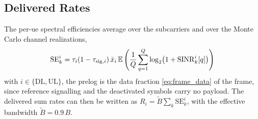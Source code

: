 
\subsection{Delivered Rates}
\label{ssec:rates}

The per-\gls{ue} spectral efficiencies average over the subcarriers and over the
Monte Carlo channel realizations,
\begin{align}
\label{eq:se}
\mathrm{SE}_{k}^{i} = \tau_{i}(1-\tau_{\mathrm{sig},i})\,\bar{x}_{i}\,
\mathbb{E}\left(\frac{1}{Q}\sum_{q=1}^{Q}
\log_{2}\!\left(1+\mathrm{SINR}_{k}^{i}[q]\right)\right)
\end{align}
with $i\in\{\mathrm{DL},\mathrm{UL}\}$, the prelog
is the data fraction \eqref{eq:frame_data} of the frame, since reference
signalling and the deactivated symbols carry no payload. 
The delivered sum rates can then be written as $R_{i}= \tilde B \sum_{k}\mathrm{SE}_{k}^{i}$, with
the effective bandwidth $\tilde B = 0.9\,B$. 

